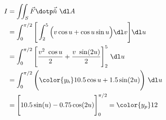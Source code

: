 \begin{enumerate}
\begin{align}
              I & = \iint_S \vec{F} \dotp \vec{\hat{n}}\ \dl A               \\
                & = \int_{0}^{\pi/2}
              \Bigg[\int_{2}^{5} \Big( v\cos u + \cos u \sin u \Big)
              \dl v \Bigg] \dl u                                             \\
                & = \int_{0}^{\pi/2} \Bigg[ \frac{v^2\ \cos u}
                  {2} + \frac{v\ \sin(2u)}{2}
              \Bigg]_{2}^{5} \ \dl u                                         \\
                & = \int_{0}^{\pi/2}
              \Bigg( {\color{y_h} 10.5 \cos u + 1.5 \sin (2u)} \Bigg)\ \dl u \\
                & = \Bigg[10.5\sin(u) - 0.75 \cos(2u)
                  \Bigg]_{0}^{\pi/2} = \color{y_p} 12
          \end{align}


\end{enumerate}
